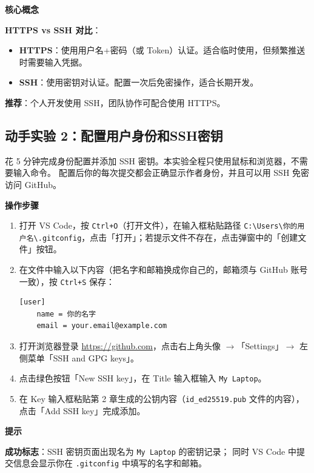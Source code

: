 \documentclass[12pt,a4paper,openany]{ctexbook}
\newenvironment{tipbox}{%
  \medskip
  \noindent\textbf{\faLightbulb\; 提示}
  \smallskip
}{%
  \medskip
}
\newenvironment{keybox}{%
  \medskip
  \noindent\textbf{\faKey\; 核心概念}
  \smallskip
}{%
  \medskip
}
\newenvironment{stepbox}{%
  \medskip
  \noindent\textbf{\faCogs\; 操作步骤}
  \smallskip
}{%
  \medskip
}
\begin{document}
\begin{keybox}
\textbf{HTTPS vs SSH 对比}：
\begin{itemize}
  \item \textbf{HTTPS}：使用用户名+密码（或 Token）认证。适合临时使用，但频繁推送时需要输入凭据。
  \item \textbf{SSH}：使用密钥对认证。配置一次后免密操作，适合长期开发。
\end{itemize}
\textbf{推荐}：个人开发使用 SSH，团队协作可配合使用 HTTPS。
\end{keybox}

\subsection*{动手实验 2：配置用户身份和SSH密钥}

花 5 分钟完成身份配置并添加 SSH 密钥。本实验全程只使用鼠标和浏览器，不需要输入命令。
配置后你的每次提交都会正确显示作者身份，并且可以用 SSH 免密访问 GitHub。

\begin{stepbox}
\begin{enumerate}[leftmargin=1.5em]
  \item 打开 VS Code，按 \texttt{Ctrl+O}（打开文件），在输入框粘贴路径 \texttt{C:\textbackslash Users\textbackslash 你的用户名\textbackslash .gitconfig}，点击「打开」；若提示文件不存在，点击弹窗中的「创建文件」按钮。
  \item 在文件中输入以下内容（把名字和邮箱换成你自己的，邮箱须与 GitHub 账号一致），按 \texttt{Ctrl+S} 保存：
\begin{lstlisting}[style=shell]
[user]
	name = 你的名字
	email = your.email@example.com
\end{lstlisting}
  \item 打开浏览器登录 \url{https://github.com}，点击右上角头像 $\to$「Settings」$\to$ 左侧菜单「SSH and GPG keys」。
  \item 点击绿色按钮「New SSH key」，在 Title 输入框输入 \texttt{My Laptop}。
  \item 在 Key 输入框粘贴第 2 章生成的公钥内容（\texttt{id\_ed25519.pub} 文件的内容），点击「Add SSH key」完成添加。
\end{enumerate}
\end{stepbox}

\begin{tipbox}
\textbf{成功标志}：SSH 密钥页面出现名为 \texttt{My Laptop} 的密钥记录；
同时 VS Code 中提交信息会显示你在 \texttt{.gitconfig} 中填写的名字和邮箱。
\end{tipbox}
\end{document}
